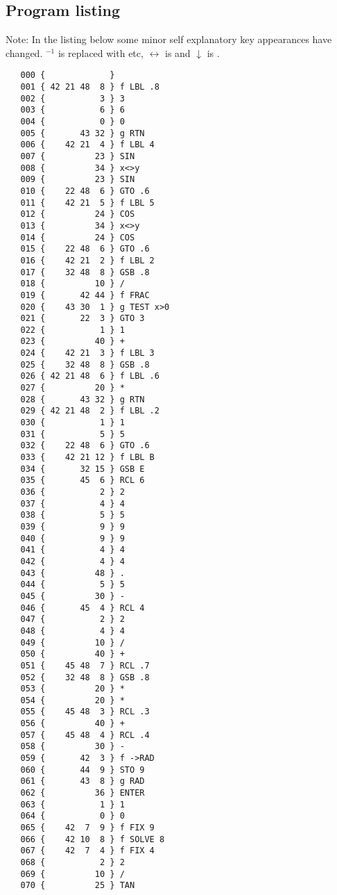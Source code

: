 \documentclass[english,a4paper,onepage, 12pt]{scrbook}
\begin{document}
\subsection{Program listing}

Note: In the listing below some minor self explanatory key appearances have changed.  $^{-1}$ is replaced with  etc, $\leftrightarrow$ is  and $\downarrow$ is .
\begin{multicols}{2}
\begin{lstlisting}
   000 {             } 
   001 { 42 21 48  8 } f LBL .8
   002 {           3 } 3
   003 {           6 } 6
   004 {           0 } 0
   005 {       43 32 } g RTN
   006 {    42 21  4 } f LBL 4
   007 {          23 } SIN
   008 {          34 } x<>y
   009 {          23 } SIN
   010 {    22 48  6 } GTO .6
   011 {    42 21  5 } f LBL 5
   012 {          24 } COS
   013 {          34 } x<>y
   014 {          24 } COS
   015 {    22 48  6 } GTO .6
   016 {    42 21  2 } f LBL 2
   017 {    32 48  8 } GSB .8
   018 {          10 } /
   019 {       42 44 } f FRAC
   020 {    43 30  1 } g TEST x>0
   021 {       22  3 } GTO 3
   022 {           1 } 1
   023 {          40 } +
   024 {    42 21  3 } f LBL 3
   025 {    32 48  8 } GSB .8
   026 { 42 21 48  6 } f LBL .6
   027 {          20 } *
   028 {       43 32 } g RTN
   029 { 42 21 48  2 } f LBL .2
   030 {           1 } 1
   031 {           5 } 5
   032 {    22 48  6 } GTO .6
   033 {    42 21 12 } f LBL B
   034 {       32 15 } GSB E
   035 {       45  6 } RCL 6
   036 {           2 } 2
   037 {           4 } 4
   038 {           5 } 5
   039 {           9 } 9
   040 {           9 } 9
   041 {           4 } 4
   042 {           4 } 4
   043 {          48 } .
   044 {           5 } 5
   045 {          30 } -
   046 {       45  4 } RCL 4
   047 {           2 } 2
   048 {           4 } 4
   049 {          10 } /
   050 {          40 } +
   051 {    45 48  7 } RCL .7
   052 {    32 48  8 } GSB .8
   053 {          20 } *
   054 {          20 } *
   055 {    45 48  3 } RCL .3
   056 {          40 } +
   057 {    45 48  4 } RCL .4
   058 {          30 } -
   059 {       42  3 } f ->RAD
   060 {       44  9 } STO 9
   061 {       43  8 } g RAD
   062 {          36 } ENTER
   063 {           1 } 1
   064 {           0 } 0
   065 {    42  7  9 } f FIX 9
   066 {    42 10  8 } f SOLVE 8
   067 {    42  7  4 } f FIX 4
   068 {           2 } 2
   069 {          10 } /
   070 {          25 } TAN

\end{lstlisting}
\end{multicols}
\end{document}
